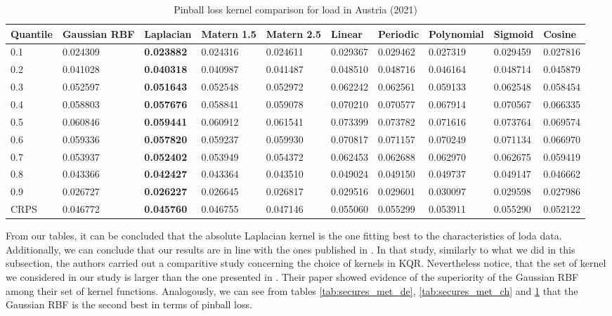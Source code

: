 \begin{table}[!ht]
    \centering
\caption{Pinball loss kernel comparison for load in Austria (2021)}
\label{tab:secures_met_at}
\begin{adjustbox}{width=\textwidth}
    \begin{tabular}{llllllllll}
\toprule
Quantile & Gaussian RBF & Laplacian & Matern 1.5 & Matern 2.5 & Linear & Periodic & Polynomial & Sigmoid & Cosine \\
\midrule
0.1 & 0.024309 & \textbf{0.023882} & 0.024316 & 0.024611 & 0.029367 & 0.029462 & 0.027319 & 0.029459 & 0.027816 \\
0.2 & 0.041028 & \textbf{0.040318} & 0.040987 & 0.041487 & 0.048510 & 0.048716 & 0.046164 & 0.048714 & 0.045879 \\
0.3 & 0.052597 & \textbf{0.051643} & 0.052548 & 0.052972 & 0.062242 & 0.062561 & 0.059133 & 0.062548 & 0.058454 \\
0.4 & 0.058803 & \textbf{0.057676} & 0.058841 & 0.059078 & 0.070210 & 0.070577 & 0.067914 & 0.070567 & 0.066335 \\
0.5 & 0.060846 & \textbf{0.059441} & 0.060912 & 0.061541 & 0.073399 & 0.073782 & 0.071616 & 0.073764 & 0.069574 \\
0.6 & 0.059336 & \textbf{0.057820} & 0.059237 & 0.059930 & 0.070817 & 0.071157 & 0.070249 & 0.071134 & 0.066970 \\
0.7 & 0.053937 & \textbf{0.052402} & 0.053949 & 0.054372 & 0.062453 & 0.062688 & 0.062970 & 0.062675 & 0.059419 \\
0.8 & 0.043366 & \textbf{0.042427} & 0.043364 & 0.043510 & 0.049024 & 0.049150 & 0.049737 & 0.049147 & 0.046662 \\
0.9 & 0.026727 & \textbf{0.026227} & 0.026645 & 0.026817 & 0.029516 & 0.029601 & 0.030097 & 0.029598 & 0.027986 \\
\midrule
CRPS & 0.046772 & \textbf{0.045760} & 0.046755 & 0.047146 & 0.055060 & 0.055299 & 0.053911 & 0.055290 & 0.052122 \\
\bottomrule
\end{tabular}
\end{adjustbox}
\end{table}
From our tables, it can be concluded that the absolute Laplacian kernel is the one fitting best to the characteristics of loda data.
Additionally, we can conclude that our results are in line with the ones published in \cite{he2017short}. In that study, similarly to what we did in this subsection, the authors carried out a comparitive study concerning the choice of kernels in KQR. Nevertheless notice, that the set of kernel we considered in our study is larger than the one presented in \cite{he2017short}.
Their paper showed evidence of the superiority of the Gaussian RBF among their set of kernel functions. Analogously, we can see from tables \ref{tab:secures_met_de}, \ref{tab:secures_met_ch} and \ref{tab:secures_met_at} that the Gaussian RBF is the second best in terms of pinball loss.

